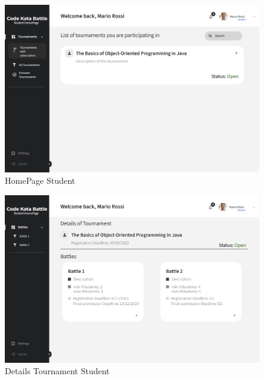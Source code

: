 \begin{figure}[H]
    \centering
    \includegraphics[width=\textwidth]{../images/homepage-student.png}
    \caption{HomePage Student}
    \label{fig:HomePage Student}
\end{figure}
\begin{figure}[H]
    \centering
    \includegraphics[width=\textwidth]{../images/details-tournament-student.png}
    \caption{Details Tournament Student}
    \label{fig:Details Tournament Student}
\end{figure}